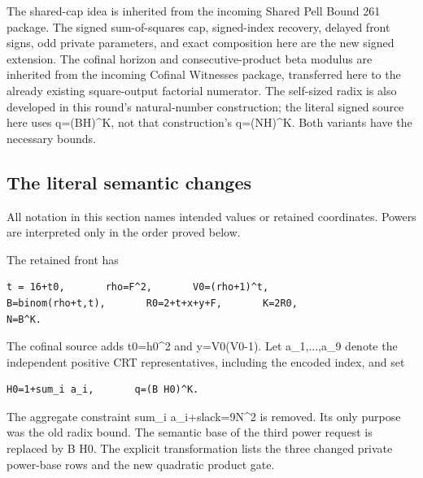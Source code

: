 The shared-cap idea is inherited from the incoming Shared Pell Bound 261 package. The signed sum-of-squares cap, signed-index recovery, delayed front signs, odd private parameters, and exact composition here are the new signed extension. The cofinal horizon and consecutive-product beta modulus are inherited from the incoming Cofinal Witnesses package, transferred here to the already existing square-output factorial numerator. The self-sized radix is also developed in this round's natural-number construction; the literal signed source here uses q=\allowbreak{}(BH)\textasciicircum{}\allowbreak{}K, not that construction's q=\allowbreak{}(NH)\textasciicircum{}\allowbreak{}K. Both variants have the necessary bounds.



\subsection{The literal semantic changes}



All notation in this section names intended values or retained coordinates. Powers are interpreted only in the order proved below.



The retained front has



\begin{verbatim}
t = 16+t0,       rho=F^2,       V0=(rho+1)^t,
B=binom(rho+t,t),       R0=2+t+x+y+F,       K=2R0,
N=B^K.
\end{verbatim}

The cofinal source adds t0=\allowbreak{}h0\textasciicircum{}\allowbreak{}2 and y=\allowbreak{}V0(V0-1). Let a\_\allowbreak{}1,...,a\_\allowbreak{}9 denote the independent positive CRT representatives, including the encoded index, and set



\begin{verbatim}
H0=1+sum_i a_i,       q=(B H0)^K.
\end{verbatim}

The aggregate constraint sum\_\allowbreak{}i a\_\allowbreak{}i+\allowbreak{}slack=\allowbreak{}9N\textasciicircum{}\allowbreak{}2 is removed. Its only purpose was the old radix bound. The semantic base of the third power request is replaced by B H0. The explicit transformation lists the three changed private power-base rows and the new quadratic product gate.



